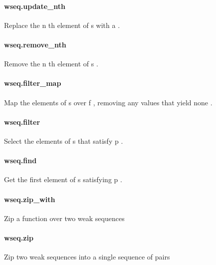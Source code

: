 \documentclass{article}
\begin{document}
\paragraph{wseq.update\_nth}
\par
Replace the 
\colorbox[RGB]{253,246,227}{{{{\color[RGB]{101, 123, 131} n }}}}th element of 
\colorbox[RGB]{253,246,227}{{{{\color[RGB]{101, 123, 131} s }}}} with 
\colorbox[RGB]{253,246,227}{{{{\color[RGB]{101, 123, 131} a }}}}.
\paragraph{wseq.remove\_nth}
\par
Remove the 
\colorbox[RGB]{253,246,227}{{{{\color[RGB]{101, 123, 131} n }}}}th element of 
\colorbox[RGB]{253,246,227}{{{{\color[RGB]{101, 123, 131} s }}}}.
\paragraph{wseq.filter\_map}
\par
Map the elements of 
\colorbox[RGB]{253,246,227}{{{{\color[RGB]{101, 123, 131} s }}}} over 
\colorbox[RGB]{253,246,227}{{{{\color[RGB]{101, 123, 131} f }}}}, removing any values that yield 
\colorbox[RGB]{253,246,227}{{{{\color[RGB]{101, 123, 131} none }}}}.
\paragraph{wseq.filter}
\par
Select the elements of 
\colorbox[RGB]{253,246,227}{{{{\color[RGB]{101, 123, 131} s }}}} that satisfy 
\colorbox[RGB]{253,246,227}{{{{\color[RGB]{101, 123, 131} p }}}}.
\paragraph{wseq.find}
\par
Get the first element of 
\colorbox[RGB]{253,246,227}{{{{\color[RGB]{101, 123, 131} s }}}} satisfying 
\colorbox[RGB]{253,246,227}{{{{\color[RGB]{101, 123, 131} p }}}}.
\paragraph{wseq.zip\_with}
\par
Zip a function over two weak sequences
\paragraph{wseq.zip}
\par
Zip two weak sequences into a single sequence of pairs
\end{document}
